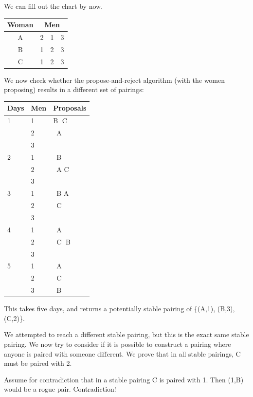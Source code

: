 \documentclass[11pt]{article}
\begin{document}
\begin{qunlist}
\begin{itemize}
{We can fill out the chart by now.
\begin{center}
\begin{tabular}{|c|ccc|}\hline 
Woman&\multicolumn{3}{|c|}{Men}\\\hline 
A&2&1&3\\\hline 
B&1&2&3\\\hline 
C&1&2&3\\\hline
\end{tabular}
\end{center}

We now check whether the propose-and-reject algorithm (with the women proposing) 
results in a different set of pairings:
\begin{center}
    \begin{tabular}{| l | l | l |}
    \hline
    Days & Men & Proposals \\ \hline
     1 & 1 & \textcircled{B} C \\ 
       & 2 & \ A \\ 
       & 3 &  \\ \hline
     2 & 1 & \ B  \\ 
       & 2 &   \ A \textcircled{C} \\ 
       & 3 &  \\ \hline
     3 & 1 & \ B \textcircled{A} \\ 
       & 2 & \ C \\ 
       & 3 & \  \\ \hline
     4 & 1 & \ A \\ 
       & 2 & \ \textcircled{C} B\\ 
       & 3 & \ \\ \hline
     5 & 1 & \ A \\ 
       & 2 & \ C\\ 
       & 3 & \ B \\ \hline
    \end{tabular}
\end{center}
This takes five days, and returns a potentially stable pairing of \{(A,1), (B,3), (C,2)\}.

We attempted to reach a different stable pairing, but this is the exact same stable pairing. We now try to consider if it is possible to construct a pairing where anyone is paired with someone different. We prove that in all stable pairings, C must be paired with 2.

Assume for contradiction that in a stable pairing C is paired with 1. 
Then (1,B) would be a rogue pair. Contradiction!

}
\end{itemize}
\end{qunlist}
\end{document}
